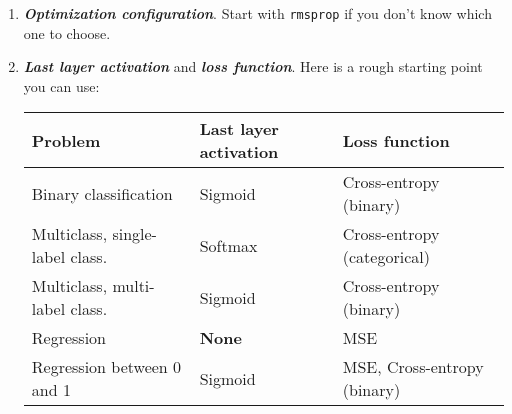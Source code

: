 \begin{enumerate}
\begin{enumerate}
\begin{itemize}
    \end{itemize}
\item {\bfseries\em Optimization configuration}.
Start with \verb+rmsprop+\cite{Tieleman2012} if you don't know which one to choose.
\item {\bfseries\em Last layer activation} and {\bfseries\em loss function}.
Here is a rough starting point you can use:
\begin{center}
\begin{tabular}{ l l l}
 Problem & Last layer activation & Loss function \\
 \hline
 Binary classification & Sigmoid & Cross-entropy (binary) \\
 Multiclass, single-label class. & Softmax & Cross-entropy (categorical) \\
 Multiclass, multi-label class. & Sigmoid & Cross-entropy (binary) \\
 Regression & {\bf None} & MSE \\
 Regression between 0 and 1 & Sigmoid & MSE, Cross-entropy (binary)
\end{tabular}
\end{center}
\end{enumerate}


\end{enumerate}
